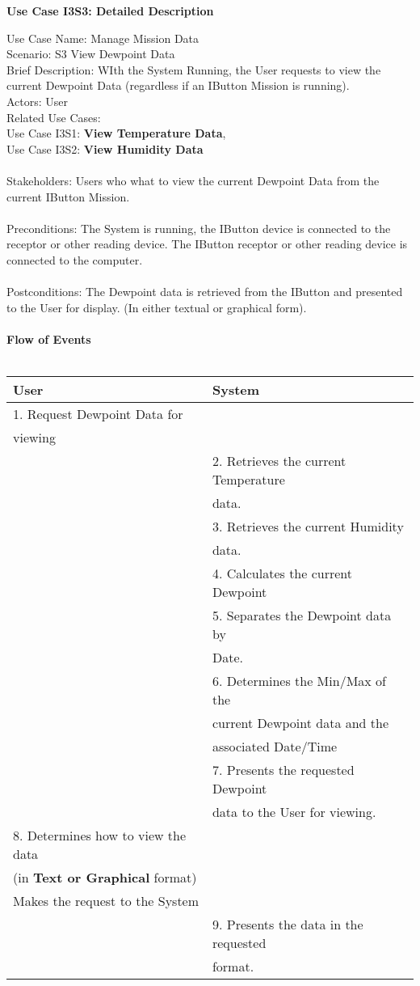 \documentclass[letterpaper]{article}
\begin{document}
\noindent
\begin{center}
\textbf{Use Case I3S3:  Detailed Description}
\end{center}
Use Case Name:  Manage Mission Data\\
Scenario: S3 View Dewpoint Data\\
Brief Description:  WIth the System Running, the User requests to view
the current Dewpoint Data (regardless if an IButton Mission is
running).\\
Actors:  User\\
Related Use Cases:\\Use Case I3S1: \textbf{View Temperature Data},\\
Use Case I3S2: \textbf{View Humidity Data}\\\\
Stakeholders:  Users who what to view the current Dewpoint Data from
the current IButton Mission.\\\\
Preconditions:  The System is running, the IButton device is connected
to the receptor or other reading device.  The IButton receptor or other
reading device is connected to the computer.\\\\
Postconditions:  The Dewpoint data is retrieved from the IButton and
presented to the User for display. (In either textual or graphical
form).\\\\
\textbf{Flow of Events}\\\\
\begin{tabular}{|l|l|}\hline
\textbf{User} & \textbf{System}\\\hline
1.  Request Dewpoint Data for & \\
viewing & \\\hline
& 2. Retrieves the current Temperature\\
& data.\\\hline
& 3. Retrieves the current Humidity\\
& data.\\\hline
& 4.  Calculates the current Dewpoint\\\hline
& 5.  Separates the Dewpoint data by\\
& Date.\\\hline
& 6.  Determines the Min/Max of the\\
& current Dewpoint data and the\\
& associated Date/Time\\\hline
& 7.  Presents the requested Dewpoint\\
& data to the User for viewing.\\\hline
8. Determines how to view the data &\\
(in \textbf{Text or Graphical} format) &\\
Makes the request to the System &\\\hline
& 9.  Presents the data in the requested\\
& format.\\\hline
\end{tabular}\\\\
\end{document}
